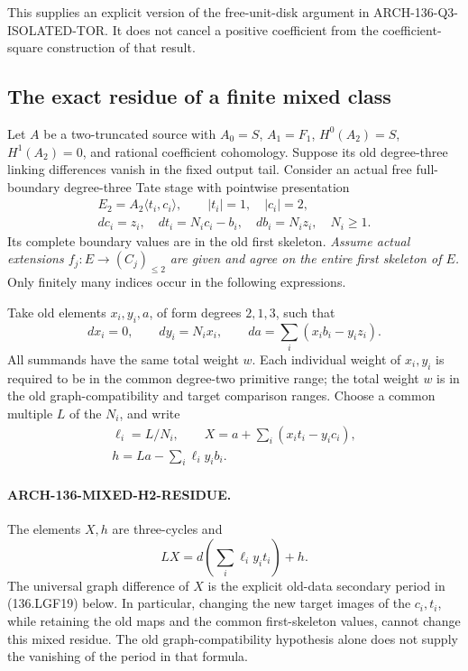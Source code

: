 This supplies an explicit version of the free-unit-disk argument in
ARCH-136-Q3-ISOLATED-TOR. It does not cancel a positive coefficient
from the coefficient-square construction of that result.

\subsection{The exact residue of a finite mixed class}

Let \(A\) be a two-truncated source with \(A_0=S\),
\(A_1=F_1\), \(H^0(A_2)=S\), \(H^1(A_2)=0\), and
rational coefficient cohomology. Suppose its old degree-three
linking differences vanish in the fixed output tail. Consider an
actual free full-boundary degree-three Tate stage with pointwise
presentation
\[
 \begin{gathered}
 E_2=A_2\langle t_i,c_i\rangle,\qquad |t_i|=1,\quad |c_i|=2,\\
 dc_i=z_i,\quad dt_i=N_i c_i-b_i,\quad db_i=N_i z_i,\quad N_i\geq1.
 \end{gathered}
                                                        \tag{136.LGF9}
\]
Its complete boundary values are in the old first skeleton.
\emph{Assume actual extensions \(f_j:E\to(C_j)_{\leq2}\)
are given and agree on the entire first skeleton of \(E\).}
Only finitely many indices occur in the following expressions.

Take old elements \(x_i,y_i,a\), of form degrees \(2,1,3\),
such that
\[
 dx_i=0,\qquad dy_i=N_i x_i,\qquad
 da=\sum_i(x_i b_i-y_i z_i).                            \tag{136.LGF10}
\]
All summands have the same total weight \(w\).
Each individual weight of \(x_i,y_i\) is required to be in the
common degree-two primitive range; the total weight \(w\) is in
the old graph-compatibility and target comparison ranges.
Choose a common multiple \(L\) of the \(N_i\), and write
\[
 \begin{gathered}
 \ell_i=L/N_i,\qquad X=a+\sum_i(x_i t_i-y_i c_i),\\
 h=L a-\sum_i\ell_i y_i b_i.
\end{gathered}
                                                        \tag{136.LGF11}
\]

\paragraph{ARCH-136-MIXED-H2-RESIDUE.}
The elements \(X,h\) are three-cycles and
\[
 LX=d\left(\sum_i\ell_i y_i t_i\right)+h.                \tag{136.LGF12}
\]
The universal graph difference of \(X\) is the explicit old-data
secondary period in (136.LGF19) below. In particular, changing the
new target images of the \(c_i,t_i\), while retaining the old
maps and the common first-skeleton values, cannot change this
mixed residue. The old graph-compatibility hypothesis alone does
not supply the vanishing of the period in that formula.

